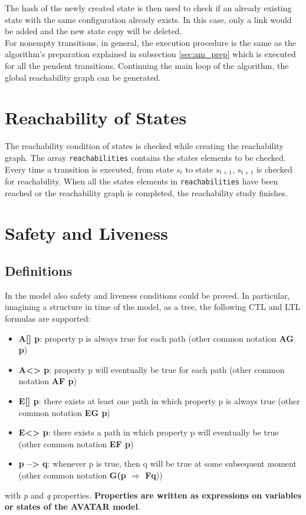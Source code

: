 \documentclass[12pt]{article}
\begin{document}
The hash of the newly created state is then used to check if an already existing state with the same configuration already exists. In this case, only a link would be added and the new state copy will be deleted.\\

For nonempty transitions, in general, the execution procedure is the same as the algorithm's preparation explained in subsection \ref{sec:am_prep} which is executed for all the pendent transitions. Continuing the main loop of the algorithm, the global reachability graph can be generated.


\section{Reachability of States}
The reachability condition of states is checked while creating the reachability graph. The array \texttt{reachabilities} contains the states elements to be checked. Every time a transition is executed, from state $s_t$ to state $s_{t+1}$, $s_{t+1}$ is checked for reachability. When all the states elements in \texttt{reachabilities} have been reached or the reachability graph is completed, the reachability study finishes.

\section{Safety and Liveness}
\subsection{Definitions}
In the model also safety and liveness conditions could be proved. In particular, imagining a structure in time of the model, as a tree, the following CTL and LTL formulas are supported:
\begin{itemize}
	\item \textbf{A[] p}: property p is always true for each path (other common notation \textbf{AG p})
	\item \textbf{A<> p}: property p will eventually be true for each path (other common notation \textbf{AF p})
	\item \textbf{E[] p}: there exists at least one path in which property p is always true (other common notation \textbf{EG p})
	\item \textbf{E<> p}:  there exists a path in which property p will eventually be true (other common notation \textbf{EF p})
	\item \textbf{p --> q}: whenever p is true, then q will be true at some subsequent moment (other common notation \textbf{G(p $\Rightarrow$ Fq}))
\end{itemize}
with \textit{p} and \textit{q} properties. \textbf{Properties are written as expressions on variables or states of the AVATAR model}.
\end{document}
